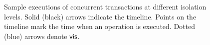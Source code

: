 \begin{figure}
\caption{\small Sample executions of concurrent transactions at different
isolation levels. Solid (black) arrows indicate the timeline. Points
on the timeline mark the time when an operation is executed. Dotted
(blue) arrows denote $\textsf{vis}$. }
\label{fig:ansi-iso-eg}
\vspace*{-12pt}
\end{figure}




